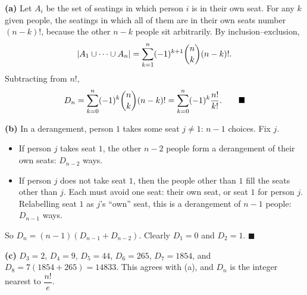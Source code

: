 \textbf{(a)} Let $A_i$ be the set of seatings in which person $i$ is in their own seat. For any $k$ given people, the seatings in which all of them are in their own seats number $(n-k)!$, because the other $n-k$ people sit arbitrarily. By inclusion--exclusion,
\[\left|A_1\cup\cdots\cup A_n\right|=\sum_{k=1}^n(-1)^{k+1}\dbinom nk(n-k)!.\]
Subtracting from $n!$,
\[D_n=\sum_{k=0}^n(-1)^k\dbinom nk(n-k)!=\sum_{k=0}^n(-1)^k\dfrac{n!}{k!}. \qquad\blacksquare\]

\textbf{(b)} In a derangement, person $1$ takes some seat $j\ne1$: $n-1$ choices. Fix $j$.
\begin{itemize}
\item If person $j$ takes seat $1$, the other $n-2$ people form a derangement of their own seats: $D_{n-2}$ ways.
\item If person $j$ does not take seat $1$, then the people other than $1$ fill the seats other than $j$. Each must avoid one seat: their own seat, or seat $1$ for person $j$. Relabelling seat $1$ as $j$'s ``own'' seat, this is a derangement of $n-1$ people: $D_{n-1}$ ways.
\end{itemize}
So $D_n=(n-1)\left(D_{n-1}+D_{n-2}\right)$. Clearly $D_1=0$ and $D_2=1$. $\blacksquare$

\textbf{(c)} $D_3=2$, $D_4=9$, $D_5=44$, $D_6=265$, $D_7=1854$, and $D_8=7(1854+265)=\boxed{14833}$. This agrees with (a), and $D_n$ is the integer nearest to $\dfrac{n!}{e}$.
